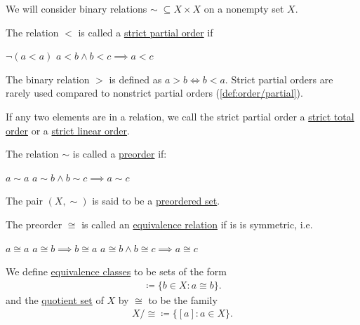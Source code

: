 \begin{definition}\label{def:orders}
  We will consider binary relations $\sim\; \subseteq X \times X$ on a nonempty set $X$.

  \begin{defenum}
    \item\label{def:order/strict_partial} The relation $<$ is called a \uline{strict partial order} if
    \begin{description}
       $\lnot(a < a)$
       $a < b \land b < c \implies a < c$
    \end{description}

    The binary relation $>$ is defined as $a > b \iff b < a$. Strict partial orders are rarely used compared to nonstrict partial orders (\cref{def:order/partial}).

    If any two elements are in a relation, we call the strict partial order a \uline{strict total order} or a \uline{strict linear order}.

    \item\label{def:order/preorder} The relation $\sim$ is called a \uline{preorder} if:
    \begin{description}
       $a \sim a$
       $a \sim b \land b \sim c \implies a \sim c$
    \end{description}

    The pair $(X, \sim)$ is said to be a \uline{preordered set}.

    \item\label{def:order/equivalence} The preorder $\cong$ is called an \uline{equivalence relation} if is is symmetric, i.e.
    \begin{description}
       $a \cong a$
       $a \cong b \implies b \cong a$
       $a \cong b \land b \cong c \implies a \cong c$
    \end{description}

    We define \uline{equivalence classes} to be sets of the form
    \begin{align*}
      [a] \coloneqq \{ b \in X \colon a \cong b \}.
    \end{align*}
    and the \uline{quotient set} of $X$ by $\cong$ to be the family
    \begin{align*}
      X / \cong \coloneqq \{ [a] \colon a \in X \}.
    \end{align*}


\end{defenum}
\end{definition}
